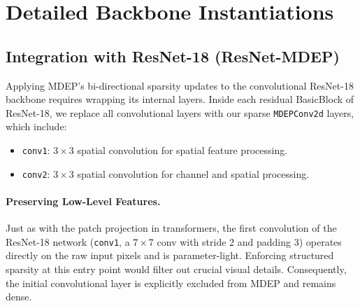 \documentclass[letterpaper]{article} %
\begin{document}
\section{Detailed Backbone Instantiations}
\subsection{Integration with ResNet-18 (ResNet-MDEP)}\label{subsec:resnet}

Applying MDEP's bi-directional sparsity updates to the convolutional ResNet-18 backbone requires wrapping its internal layers. Inside each residual BasicBlock of ResNet-18, we replace all convolutional layers with our sparse \texttt{MDEPConv2d} layers, which include:
\begin{itemize}
    \item \texttt{conv1}: $3 \times 3$ spatial convolution for spatial feature processing.
    \item \texttt{conv2}: $3 \times 3$ spatial convolution for channel and spatial processing.
\end{itemize}

\paragraph{Preserving Low-Level Features.}
Just as with the patch projection in transformers, the first convolution of the ResNet-18 network (\texttt{conv1}, a $7 \times 7$ conv with stride 2 and padding 3) operates directly on the raw input pixels and is parameter-light. Enforcing structured sparsity at this entry point would filter out crucial visual details. Consequently, the initial convolutional layer is explicitly excluded from MDEP and remains dense.
\end{document}
